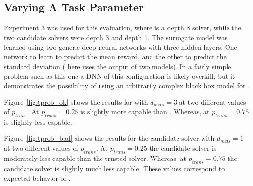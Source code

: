 \subsection{Varying A Task Parameter}
Experiment 3 was used for this evaluation, where \solvestar{} is a depth 8 solver, while the two candidate solvers were depth 3 and depth 1. The surrogate model \surrogate{} was learned using two generic deep neural networks with three hidden layers. One network to learn to predict the mean reward, and the other to predict the standard deviation (\surrogate{} here uses the output of two models). In a fairly simple problem such as this one a DNN of this configuration is likely overkill, but it demonstrates the possibility of using an arbitrarily complex black box model for \surrogate.

Figure~\ref{fig:tprob_ok} shows the results for \solve{} with $d_{mcts}=3$ at two different values of $p_{trans}$. At $p_{trans}=0.25$ \solve{} is slightly more capable than \solvestar{}. Whereas, at $p_{trans}=0.75$ \solve{} is slightly less capable.

Figure~\ref{fig:tprob_bad} shows the results for the candidate solver with $d_{mcts}=1$ at two different values of $p_{trans}$. At $p_{trans}=0.25$ the candidate solver is moderately less capable than the trusted solver. Whereas, at $p_{trans}=0.75$ the candidate solver is slightly much less capable. These values correspond to expected behavior of \xQ.

